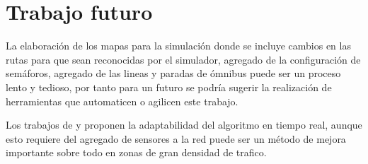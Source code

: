 \section{Trabajo futuro}

La elaboración de los mapas para la simulación donde se incluye cambios en las rutas para que sean reconocidas por el simulador, agregado de la configuración de semáforos, agregado de las lineas y paradas de ómnibus puede ser un proceso lento y tedioso, por tanto para un futuro se podría sugerir la realización de herramientas que automaticen o agilicen este trabajo.

Los trabajos de  \citep{Montana1996} y \citep{Vogel2000}  proponen la adaptabilidad del algoritmo en tiempo real, aunque esto requiere del agregado de sensores a la red puede ser un método de mejora importante sobre todo en zonas de gran densidad de trafico.
